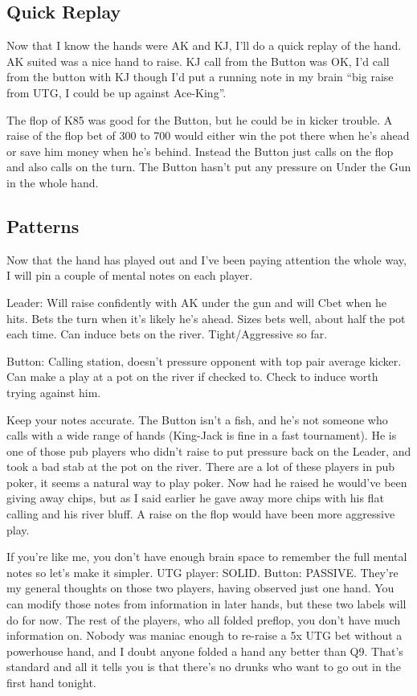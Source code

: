 \subsection*{Quick Replay}

Now that I know the hands were AK and KJ, I'll do a quick replay
of the hand. AK suited was a nice hand to raise. KJ call from the
Button was OK, I'd call from the button with KJ though I'd put
a running note in my brain ``big raise from UTG, I could be up
against Ace-King''.

The flop of K85 was good for the Button, but he could be in kicker
trouble. A raise of the flop bet of 300 to 700 would either win the
pot there when he's ahead or save him money when he's behind. Instead
the Button just calls on the flop and also calls on the turn. The
Button hasn't put any pressure on Under the Gun in the whole hand.

\subsection*{Patterns}

Now that the hand has played out and I've been paying attention the whole
way, I will pin a couple of mental notes on each player.

Leader: Will raise confidently with AK under the gun and will Cbet when
he hits. Bets the turn when it's likely he's ahead. Sizes bets well, about
half the pot each time. Can induce bets on the river. Tight/Aggressive so far.

Button: Calling station, doesn't pressure opponent with top pair
average kicker. Can make a play at a pot on the river if checked to.
Check to induce worth trying against him.

Keep your notes accurate. The Button isn't a fish,
and he's not someone who calls with a wide range of hands (King-Jack
is fine in a fast tournament). He is one of those
pub players who didn't raise to put pressure back on the Leader, and
took a bad stab at the pot on the river. There are a lot of these
players in pub poker, it seems a natural way to play poker. Now had he
raised he would've been giving away chips, but as I said earlier he
gave away more chips with his flat calling and his river bluff. A
raise on the flop would have been more aggressive play.

If you're like me, you don't have enough brain space to remember the
full mental notes so let's make it simpler. UTG player: SOLID.
Button: PASSIVE. They're my general thoughts on those two players,
having observed just one hand. You can modify those notes from
information in later hands, but these two labels will do for now. The
rest of the players, who all folded preflop, you don't have much
information on. Nobody was maniac enough to re-raise a 5x UTG bet
without a powerhouse hand, and I doubt anyone folded a hand any better
than Q9. That's standard and all it tells you is that there's no
drunks who want to go out in the first hand tonight.

